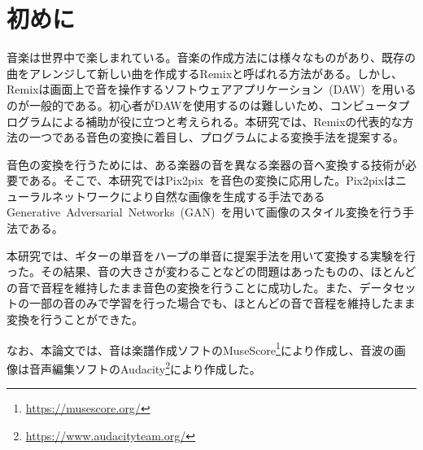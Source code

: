 \chapter{初めに}

音楽は世界中で楽しまれている。音楽の作成方法には様々なものがあり、既存の曲をアレンジして新しい曲を作成するRemixと呼ばれる方法がある。しかし、Remixは画面上で音を操作するソフトウェアアプリケーション~(DAW)~を用いるのが一般的である。初心者がDAWを使用するのは難しいため、コンピュータプログラムによる補助が役に立つと考えられる。本研究では、Remixの代表的な方法の一つである音色の変換に着目し、プログラムによる変換手法を提案する。

音色の変換を行うためには、ある楽器の音を異なる楽器の音へ変換する技術が必要である。そこで、本研究ではPix2pix~\cite{pix2pix}を音色の変換に応用した。Pix2pixはニューラルネットワークにより自然な画像を生成する手法であるGenerative~Adversarial~Networks~(GAN)~\cite{GAN}を用いて画像のスタイル変換を行う手法である。

本研究では、ギターの単音をハープの単音に提案手法を用いて変換する実験を行った。その結果、音の大きさが変わることなどの問題はあったものの、ほとんどの音で音程を維持したまま音色の変換を行うことに成功した。また、データセットの一部の音のみで学習を行った場合でも、ほとんどの音で音程を維持したまま変換を行うことができた。

なお、本論文では、音は楽譜作成ソフトのMuseScore\footnote{\url{https://musescore.org/}}により作成し、音波の画像は音声編集ソフトのAudacity\footnote{\url{https://www.audacityteam.org/}}により作成した。

\begin{comment}
既存研究の軽い紹介…。GAN,Pix2pix…。音楽の変換の研究(Hukebox,スペクトログラム,MIDI)…。この手法では…。音色の変換のみを扱うことで短期的な構造のみに着目できる点で他の音楽生成の研究よりも計算時間を削減できると期待される。
~\cite{Jukebox}
\end{comment}